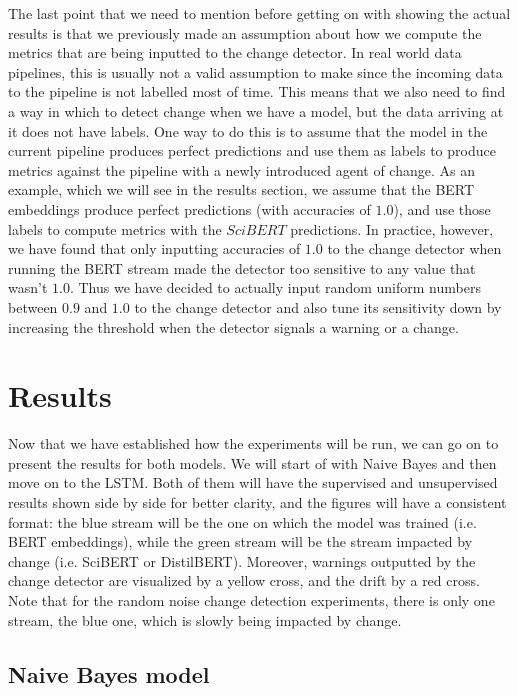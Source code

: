\documentclass[12pt]{extreport}
\begin{document}
The last point that we need to mention before getting on with showing the actual results is that we previously made an assumption about how we compute the metrics that are being inputted to the change detector. In real world data pipelines, this is usually not a valid assumption to make since the incoming data to the pipeline is not labelled most of time. This means that we also need to find a way in which to detect change when we have a model, but the data arriving at it does not have labels. One way to do this is to assume that the model in the current pipeline produces perfect predictions and use them as labels to produce metrics against the pipeline with a newly introduced agent of change. As an example, which we will see in the results section, we assume that the BERT embeddings produce perfect predictions (with accuracies of $1.0$), and use those labels to compute metrics with the $SciBERT$ predictions. In practice, however, we have found that only inputting accuracies of $1.0$ to the change detector when running the BERT stream made the detector too sensitive to any value that wasn't $1.0$. Thus we have decided to actually input random uniform numbers between $0.9$ and $1.0$ to the change detector and also tune its sensitivity down by increasing the threshold when the detector signals a warning or a change.

\newpage

\section{Results}

Now that we have established how the experiments will be run, we can go on to present the results for both models. We will start of with Naive Bayes and then move on to the LSTM. Both of them will have the supervised and unsupervised results shown side by side for better clarity, and the figures will have a consistent format: the blue stream will be the one on which the model was trained (i.e. BERT embeddings), while the green stream will be the stream impacted by change (i.e. SciBERT or DistilBERT). Moreover, warnings outputted by the change detector are visualized by a yellow cross, and the drift by a red cross. Note that for the random noise change detection experiments, there is only one stream, the blue one, which is slowly being impacted by change.

\subsection{Naive Bayes model}
\end{document}
